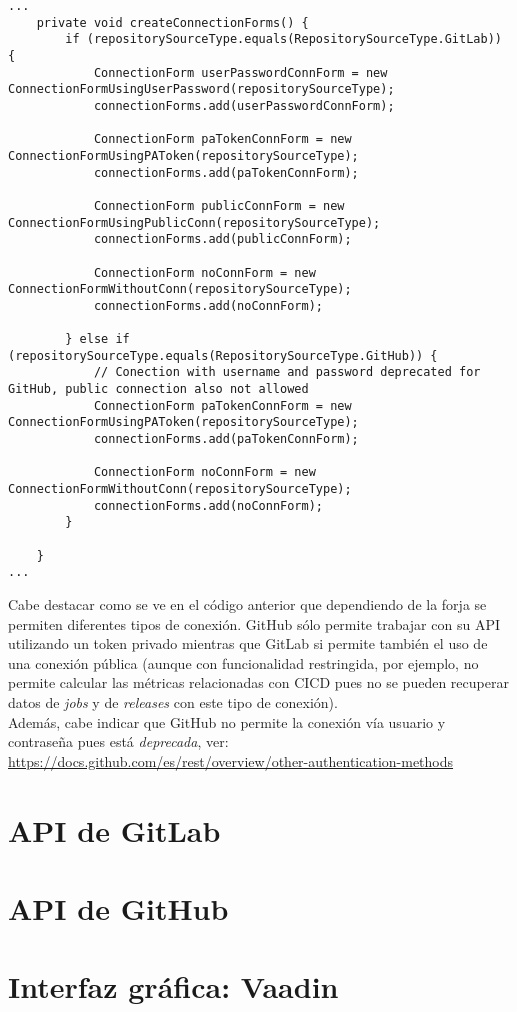 \begin{minipage}{\linewidth}
{\tiny
\begin{verbatim}
...
	private void createConnectionForms() {
		if (repositorySourceType.equals(RepositorySourceType.GitLab)) {
			ConnectionForm userPasswordConnForm = new ConnectionFormUsingUserPassword(repositorySourceType);
			connectionForms.add(userPasswordConnForm);

			ConnectionForm paTokenConnForm = new ConnectionFormUsingPAToken(repositorySourceType);
			connectionForms.add(paTokenConnForm);

			ConnectionForm publicConnForm = new ConnectionFormUsingPublicConn(repositorySourceType);
			connectionForms.add(publicConnForm);

			ConnectionForm noConnForm = new ConnectionFormWithoutConn(repositorySourceType);
			connectionForms.add(noConnForm);
			
		} else if (repositorySourceType.equals(RepositorySourceType.GitHub)) {
			// Conection with username and password deprecated for GitHub, public connection also not allowed
			ConnectionForm paTokenConnForm = new ConnectionFormUsingPAToken(repositorySourceType);
			connectionForms.add(paTokenConnForm);

			ConnectionForm noConnForm = new ConnectionFormWithoutConn(repositorySourceType);
			connectionForms.add(noConnForm);
		}
	
	}
...
\end{verbatim}
}
\end{minipage}

Cabe destacar como se ve en el código anterior que dependiendo de la forja se permiten diferentes tipos de conexión. GitHub sólo permite trabajar con su API utilizando un token privado mientras que GitLab si permite también el uso de una conexión pública (aunque con funcionalidad restringida, por ejemplo, no permite calcular las métricas relacionadas con CICD pues no se pueden recuperar datos de \textit{jobs} y de \textit{releases} con este tipo de conexión).\\
Además, cabe indicar que GitHub no permite la conexión vía usuario y contraseña pues está \textit{deprecada}, ver:\\
\url{https://docs.github.com/es/rest/overview/other-authentication-methods}


\section{API de GitLab} %
\section{API de GitHub} %
\section{Interfaz gráfica: Vaadin}